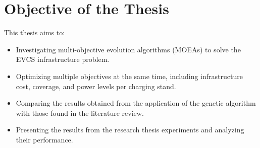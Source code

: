 \section{Objective of the Thesis}
This thesis aims to:
\begin{itemize}
    \item Investigating multi-objective evolution algorithms (MOEAs) to solve the EVCS infrastructure problem.
    \item Optimizing multiple objectives at the same time, including infrastructure cost, coverage, and power levels per charging stand.
    \item Comparing the results obtained from the application of the genetic algorithm with those found in the literature review.
    \item Presenting the results from the research thesis experiments and analyzing their performance.
\end{itemize}

